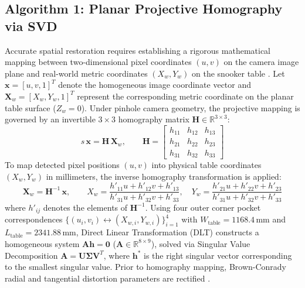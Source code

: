 \subsection{Algorithm 1: Planar Projective Homography via SVD}
Accurate spatial restoration requires establishing a rigorous mathematical mapping between two-dimensional pixel coordinates $(u, v)$ on the camera image plane and real-world metric coordinates $(X_w, Y_w)$ on the snooker table \cite{ref19}. Let $\mathbf{x} = [u, v, 1]^T$ denote the homogeneous image coordinate vector and $\mathbf{X}_w = [X_w, Y_w, 1]^T$ represent the corresponding metric coordinate on the planar table surface ($Z_w = 0$). Under pinhole camera geometry, the projective mapping is governed by an invertible $3 \times 3$ homography matrix $\mathbf{H} \in \mathbb{R}^{3 \times 3}$:
\begin{equation}
    s \, \mathbf{x} = \mathbf{H} \, \mathbf{X}_w, \qquad
    \mathbf{H} = \begin{bmatrix}
        h_{11} & h_{12} & h_{13} \\
        h_{21} & h_{22} & h_{23} \\
        h_{31} & h_{32} & h_{33}
    \end{bmatrix}
    \label{eq:homography_forward}
\end{equation}
To map detected pixel positions $(u, v)$ into physical table coordinates $(X_w, Y_w)$ in millimeters, the inverse homography transformation is applied:
\begin{equation}
    \mathbf{X}_w = \mathbf{H}^{-1} \, \mathbf{x}, \qquad
    X_w = \frac{h'_{11} u + h'_{12} v + h'_{13}}{h'_{31} u + h'_{32} v + h'_{33}}, \quad
    Y_w = \frac{h'_{21} u + h'_{22} v + h'_{23}}{h'_{31} u + h'_{32} v + h'_{33}}
    \label{eq:metric_xy}
\end{equation}
where $h'_{ij}$ denotes the elements of $\mathbf{H}^{-1}$. Using four outer corner pocket correspondences $\{ (u_i, v_i) \leftrightarrow (X_{w,i}, Y_{w,i}) \}_{i=1}^4$ with $W_{\text{table}} = 1168.4\,\text{mm}$ and $L_{\text{table}} = 2341.88\,\text{mm}$, Direct Linear Transformation (DLT) constructs a homogeneous system $\mathbf{A}\mathbf{h} = \mathbf{0}$ ($\mathbf{A} \in \mathbb{R}^{8 \times 9}$), solved via Singular Value Decomposition $\mathbf{A} = \mathbf{U}\mathbf{\Sigma}\mathbf{V}^T$, where $\mathbf{h}^*$ is the right singular vector corresponding to the smallest singular value. Prior to homography mapping, Brown-Conrady radial and tangential distortion parameters are rectified \cite{ref35}.

